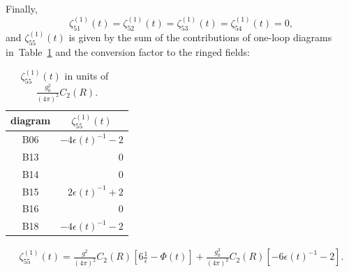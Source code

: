Finally,
\begin{equation}
   \zeta_{51}^{(1)}(t)
   =\zeta_{52}^{(1)}(t)=\zeta_{53}^{(1)}(t)=\zeta_{54}^{(1)}(t)=0,
\label{eq:(4.53)}
\end{equation}
and $\zeta_{55}^{(1)}(t)$ is given by the sum of the contributions of one-loop
diagrams in~Table~\ref{table:4} and the conversion factor to the ringed fields:
%
\begin{table}
\caption{$\zeta_{55}^{(1)}(t)$ in units of~$\frac{g_0^2}{(4\pi)^2}C_2(R)$.}
\label{table:4}
\begin{center}
\renewcommand{\arraystretch}{2.2}
\setlength{\tabcolsep}{20pt}
\begin{tabular}{cr}
\toprule
 diagram & \multicolumn{1}{c}{$\zeta_{55}^{(1)}(t)$} \\
\midrule
 B06 & $-4\epsilon(t)^{-1}-2$ \\
 B13 & $0$ \\
 B14 & $0$ \\
 B15 & $2\epsilon(t)^{-1}+2$ \\
 B16 & $0$ \\
 B18 & $-4\epsilon(t)^{-1}-2$ \\
\bottomrule
\end{tabular}
\end{center}
\end{table}
%
\begin{align}
   \zeta_{55}^{(1)}(t)
   =\frac{g^2}{(4\pi)^2}C_2(R)
   \left[6\frac{1}{\epsilon}-\Phi(t)\right]
   +\frac{g_0^2}{(4\pi)^2}C_2(R)
   \left[-6\epsilon(t)^{-1}-2\right].
\label{eq:(4.54)}
\end{align}

